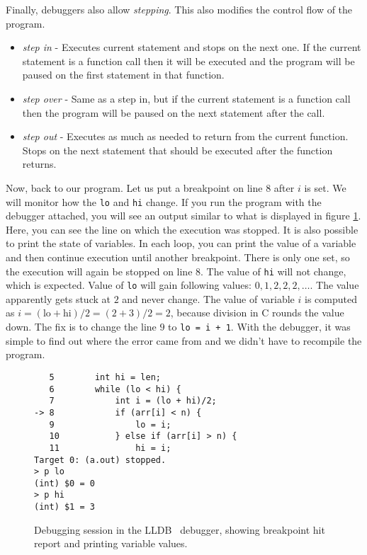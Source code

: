 Finally, debuggers also allow \textit{stepping}. This also modifies the control
flow of the program.
\begin{itemize}
    \item \textit{step in} - Executes current statement and stops on the next
        one. If the current statement is a function call then it will be
        executed and the program will be paused on the first statement in that
        function.
    \item \textit{step over} - Same as a step in, but if the current statement
        is a function call then the program will be paused on the next
        statement after the call.
    \item \textit{step out} -  Executes as much as needed to return from the
        current function. Stops on the next statement that should be executed
        after the function returns.
\end{itemize}

Now, back to our program. Let us put a breakpoint on line $8$ after $i$ is set.
We will monitor how the \texttt{lo} and \texttt{hi} change. If you run the
program with the debugger attached, you will see an output similar to what is
displayed in figure \ref{fig:lldb-debug1}. Here, you can see the line on which
the execution was stopped. It is also possible to print the state of variables.
In each loop, you can print the value of a variable and then continue execution
until another breakpoint. There is only one set, so the execution will again be
stopped on line $8$. The value of \texttt{hi} will not change, which is
expected. Value of \texttt{lo} will gain following values: $0, 1, 2, 2, 2,
\dots$. The value apparently gets stuck at $2$ and never change. The value of
variable $i$ is computed as $i = (\text{lo} + \text{hi})/2 = (2 + 3)/2 = 2$,
because division in C rounds the value down. The fix is to change the line $9$
to \texttt{lo = i + 1}. With the debugger, it was simple to find out where the
error came from and we didn't have to recompile the program.

\begin{figure}
\begin{verbatim}
   5   	    int hi = len;
   6   	    while (lo < hi) {
   7   	        int i = (lo + hi)/2;
-> 8   	        if (arr[i] < n) {
   9   	            lo = i;
   10  	        } else if (arr[i] > n) {
   11  	            hi = i;
Target 0: (a.out) stopped.
> p lo
(int) $0 = 0
> p hi
(int) $1 = 3
\end{verbatim}
    \caption{Debugging session in the LLDB~\cite{lldb} debugger, showing
    breakpoint hit report and printing variable values.}
    \label{fig:lldb-debug1}
\end{figure}

